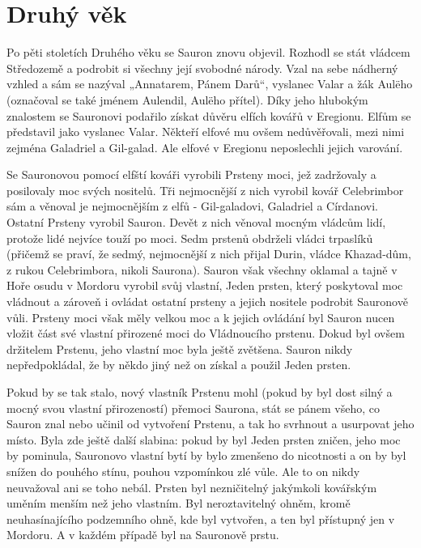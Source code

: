 \documentclass[12pt]{report}
\begin{document}
\section{Druhý věk}
Po pěti stoletích Druhého věku se Sauron znovu objevil. Rozhodl se stát vládcem Středozemě a podrobit si všechny její svobodné národy. Vzal na sebe nádherný vzhled a sám se nazýval „Annatarem, Pánem Darů“, vyslanec Valar a žák Aulëho (označoval se také jménem Aulendil, Aulëho přítel). Díky jeho hlubokým znalostem se Sauronovi podařilo získat důvěru elfích kovářů v Eregionu. Elfům se představil jako vyslanec Valar. Někteří elfové mu ovšem nedůvěřovali, mezi nimi zejména Galadriel a Gil-galad. Ale elfové v Eregionu neposlechli jejich varování.

Se Sauronovou pomocí elfští kováři vyrobili Prsteny moci, jež zadržovaly a posilovaly moc svých nositelů. Tři nejmocnější z nich vyrobil kovář Celebrimbor sám a věnoval je nejmocnějším z elfů - Gil-galadovi, Galadriel a Círdanovi. Ostatní Prsteny vyrobil Sauron. Devět z nich věnoval mocným vládcům lidí, protože lidé nejvíce touží po moci. Sedm prstenů obdrželi vládci trpaslíků (přičemž se praví, že sedmý, nejmocnější z nich přijal Durin, vládce Khazad-dûm, z rukou Celebrimbora, nikoli Saurona). Sauron však všechny oklamal a tajně v Hoře osudu v Mordoru vyrobil svůj vlastní, Jeden prsten, který poskytoval moc vládnout a zároveň i ovládat ostatní prsteny a jejich nositele podrobit Sauronově vůli. Prsteny moci však měly velkou moc a k jejich ovládání byl Sauron nucen vložit část své vlastní přirozené moci do Vládnoucího prstenu. Dokud byl ovšem držitelem Prstenu, jeho vlastní moc byla ještě zvětšena. Sauron nikdy nepředpokládal, že by někdo jiný než on získal a použil Jeden prsten.

Pokud by se tak stalo, nový vlastník Prstenu mohl (pokud by byl dost silný a mocný svou vlastní přirozeností) přemoci Saurona, stát se pánem všeho, co Sauron znal nebo učinil od vytvoření Prstenu, a tak ho svrhnout a usurpovat jeho místo. Byla zde ještě další slabina: pokud by byl Jeden prsten zničen, jeho moc by pominula, Sauronovo vlastní bytí by bylo zmenšeno do nicotnosti a on by byl snížen do pouhého stínu, pouhou vzpomínkou zlé vůle. Ale to on nikdy neuvažoval ani se toho nebál. Prsten byl nezničitelný jakýmkoli kovářským uměním menším než jeho vlastním. Byl neroztavitelný ohněm, kromě neuhasínajícího podzemního ohně, kde byl vytvořen, a ten byl přístupný jen v Mordoru. A v každém případě byl na Sauronově prstu.
\end{document}
